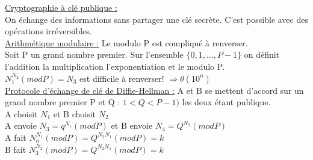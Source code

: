 \documentclass[../main.tex]{subfiles}
\begin{document}
\quad \underline{Cryptographie à clé publique :}\\
On échange des informations sans partager une clé secrète. C'est possible avec des opérations irréversibles.\\
\underline{Arithmétique modulaire :} Le modulo P est compliqué à renverser.\\
Soit P un grand nombre premier. Sur l'ensemble $\{0,1,\dots, P-1\}$ on définit l'addition la multiplication l'exponentiation et le modulo P.\\
$N_1^{N_2}(modP) = N_3$ est difficile à renverser! $\Rightarrow \theta(10^n)$\\

\underline{Protocole d'échange de clé de Diffie-Hellman :} A et B se mettent d'accord sur un grand nombre premier P et Q : $1<Q<P-1)$ les deux étant publique.\\
A choisit $N_1$ et B choisit $N_2$\\
A envoie $N_3 = q^{N_1}(modP)$ et B envoie $N_4 = Q^{N_2}(modP)$\\
A fait $N_a^{N_1}(modP) = Q^{N_2N_1}(modP) = k$\\
B fait $N_3^{N_2}(modP) = Q^{N_2N_1}(modP) = k$
\end{document}
